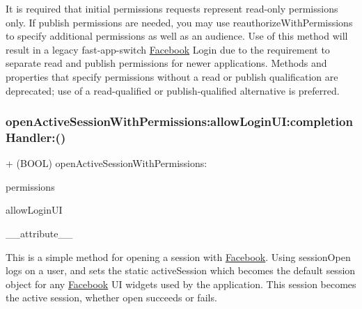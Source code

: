 It is required that initial permissions requests represent read-\/only permissions only. If publish permissions are needed, you may use reauthorize\+With\+Permissions to specify additional permissions as well as an audience. Use of this method will result in a legacy fast-\/app-\/switch \hyperlink{interfaceFacebook}{Facebook} Login due to the requirement to separate read and publish permissions for newer applications. Methods and properties that specify permissions without a read or publish qualification are deprecated; use of a read-\/qualified or publish-\/qualified alternative is preferred. \mbox{\label{interfaceFBSession_ac90957d41f538f96b5d8c9087ad3ad2d}} 
\subsubsection{\texorpdfstring{open\+Active\+Session\+With\+Permissions\+:allow\+Login\+U\+I\+:completion\+Handler\+:()}{openActiveSessionWithPermissions:allowLoginUI:completionHandler:()}\hspace{0.1cm}{\footnotesize\ttfamily [4/5]}}
{\footnotesize\ttfamily + (B\+O\+OL) open\+Active\+Session\+With\+Permissions\+: \begin{DoxyParamCaption}\item[{(N\+S\+Array $\ast$)}]{permissions }\item[{allowLoginUI:(B\+O\+OL)}]{allow\+Login\+UI }\item[{completionHandler:((deprecated))}]{\+\_\+\+\_\+attribute\+\_\+\+\_\+ }\end{DoxyParamCaption}}

This is a simple method for opening a session with \hyperlink{interfaceFacebook}{Facebook}. Using session\+Open logs on a user, and sets the static active\+Session which becomes the default session object for any \hyperlink{interfaceFacebook}{Facebook} UI widgets used by the application. This session becomes the active session, whether open succeeds or fails.


